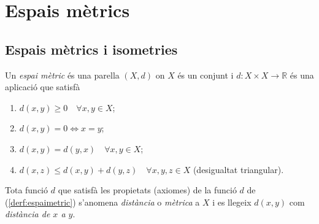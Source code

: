 \documentclass[../main.tex]{subfiles}
\begin{document}
\chapter{Espais mètrics}





\section{Espais mètrics i isometries}


\begin{defi}
\label{derf:espaimetric} Un \textit{espai mètric} és una parella $(X,d)$ on $X$ és un conjunt i $d:X\times X\rightarrow \mathbb{R}$ és una aplicació que satisfà
\begin{enumerate}[(1)]
    \item $d(x,y)\geq 0\quad\forall x,y\in X$;
    \item $d(x,y) = 0 \Longleftrightarrow x = y$;
    \item $d(x,y) = d(y,x)\quad \forall x,y\in X$;
    \item $d(x,z)\leq d(x,y)+d(y,z)\quad \forall x,y,z\in X$ (desigualtat triangular).
\end{enumerate}
\end{defi}

\begin{defi}
[Distància]\label{def:distancia} Tota funció $d$ que satisfà les propietats (axiomes) de la funció $d$ de (\ref{derf:espaimetric}) s'anomena \textit{distància} o \textit{mètrica} a $X$ i es llegeix $d(x,y)$ com \textit{distància de $x$ a $y$}.
\end{defi}
\end{document}

